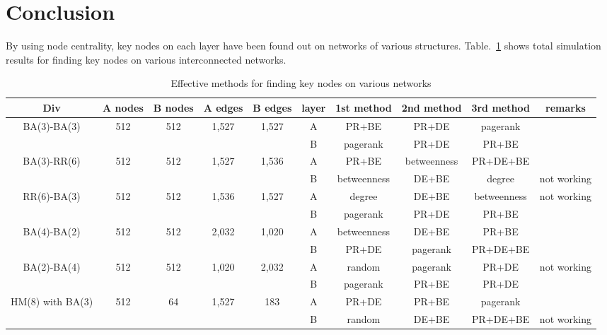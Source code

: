 \section{Conclusion}
By using node centrality, key nodes on each layer have been found out on networks of various structures. Table.~\ref{effective methods} shows total simulation results for finding key nodes on various interconnected networks. 
\begin{table}[!htb]
	\scriptsize
	\centering
	\caption{Effective methods for finding key nodes on various networks}
	\label{effective methods}
	\begin{center}
		\begin{tabular}{c|c|c|c|c|c|c|c|c|c} \hline\hline
		  Div                              & A nodes & B nodes & A edges & B edges & layer & 1st method & 2nd method  & 3rd method  & remarks    \\ \hline \hline
         \multirow{1}{*}{BA(3)-BA(3)}      & 512 	 & 512     & 1,527   & 1,527   & A     & PR+BE      & PR+DE       & pagerank    &            \\ 
			                               &  	     &         &         &         & B     & pagerank   & PR+DE       & PR+BE       &		     \\ \hline   
	     \multirow{1}{*}{BA(3)-RR(6)}      & 512     & 512     & 1,527   & 1,536   & A     & PR+BE      & betweenness & PR+DE+BE    &            \\
	                                       &         &         &         &         & B     & betweenness& DE+BE       & degree      & not working\\ \hline
	     \multirow{1}{*}{RR(6)-BA(3)}      & 512     & 512     & 1,536   & 1,527   & A     & degree     & DE+BE       & betweenness & not working\\ 
	                                       &         &         &         &         & B     & pagerank   & PR+DE       & PR+BE       &            \\ \hline
		 \multirow{1}{*}{BA(4)-BA(2)}      & 512     & 512     & 2,032   & 1,020   & A     & betweenness& DE+BE       & PR+BE       &            \\ 
		                                   &         &         &         &         & B     & PR+DE      & pagerank    & PR+DE+BE    &            \\ \hline
		 \multirow{1}{*}{BA(2)-BA(4)}      & 512     & 512     & 1,020   & 2,032   & A     & random     & pagerank    & PR+DE       & not working\\ 
		                                   &         &         &         &         & B     & pagerank   & PR+BE       & PR+DE       &            \\ \hline
		 \multirow{1}{*}{HM(8) with BA(3)} & 512     & 64      & 1,527   & 183     & A     & PR+DE      & PR+BE       & pagerank    &            \\ 
		                                   &         &         &         &         & B     & random     & DE+BE       & PR+DE+BE    & not working\\ \hline
			\hline
		\end{tabular}
	\end{center}
\end{table}
